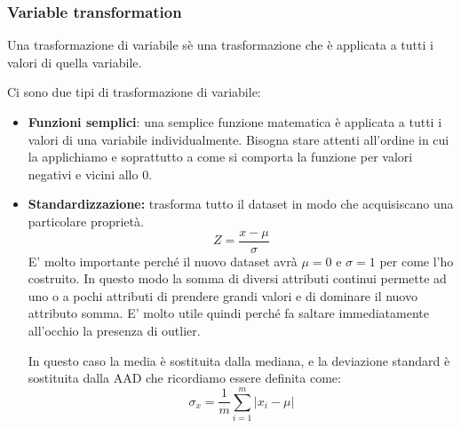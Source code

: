 \subsubsection{Variable transformation}

\begin{defn}
Una trasformazione di variabile sè una trasformazione che è applicata a tutti i valori di quella variabile.
\end{defn}

Ci sono due tipi di trasformazione di variabile:
\begin{itemize}
	\item \textbf{Funzioni semplici}: una semplice funzione matematica è applicata a tutti i valori di una variabile individualmente. Bisogna stare attenti all'ordine in cui la applichiamo e soprattutto a come si comporta la funzione per valori negativi e vicini allo 0.
	\item \textbf{Standardizzazione:} trasforma tutto il dataset in modo che acquisiscano una particolare proprietà.
	\[Z = \frac{x - \mu}{\sigma}\]
	E' molto importante perché il nuovo dataset avrà $\mu = 0$ e $\sigma = 1$ per come l'ho costruito. In questo modo la somma di diversi attributi continui permette ad uno o a pochi attributi di prendere grandi valori e di dominare il nuovo attributo somma. E' molto utile quindi perché fa saltare immediatamente all'occhio la presenza di outlier.
	
	In questo caso la media è sostituita dalla mediana, e la deviazione standard è sostituita dalla AAD che ricordiamo essere definita come:
	\[\sigma_{x} = \frac{1}{m} \sum_{i = 1}^{m}|x_{i}- \mu|\]
\end{itemize}

